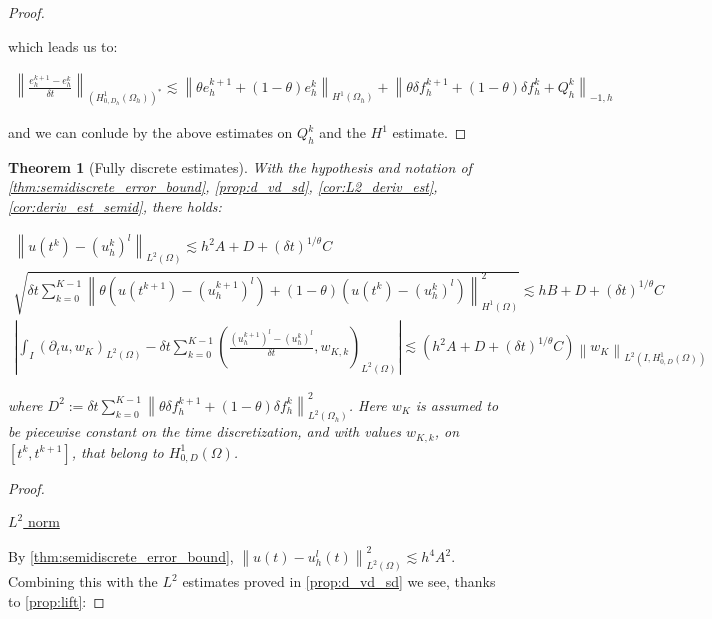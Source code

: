 \documentclass[english,a4paper,9pt,oneside]{scrbook}	%
\theoremstyle{break}
\newtheorem{thm}[equation]{Theorem}
\newenvironment{mproof}[1][\proofname]{%
  \begin{proof}[#1]$ $\par\nobreak\ignorespaces
}{%
  \end{proof}
}
\renewcommand*{\proofname}{Proof}
\theoremstyle{remark}
\newcommand{\ds}{\displaystyle}
\newcommand{\norm}[1]{\left\lVert#1\right\rVert}
\begin{document}
\begin{appendices}
\begin{mproof}
which leads us to:

\begin{align*}
\norm{ \frac{e_{h}^{k+1}-e_h^k}{\delta t}}_{(H^1_{0,D_h}(\Omega_h))^*} \lesssim  \norm{\theta e_h^{k+1}+(1-\theta)e^k_h}_{H^1(\Omega_h)} + \norm{\theta \delta f_h^{k+1}+(1-\theta)\delta f_h^k + Q_h^k}_{-1,h}
\end{align*}

and we can conlude by the above estimates on $Q_h^k$ and the $H^1$ estimate.
\end{mproof}

\begin{thm}[Fully discrete estimates]
\label{thm:fully_discr_est_par}
With the hypothesis and notation of \cref{thm:semidiscrete_error_bound}, \cref{prop:d_vd_sd}, \cref{cor:L2_deriv_est}, \cref{cor:deriv_est_semid}, there holds:

\begin{align*}
	\norm{u(t^k)-(u_h^k)^l}_{L^2(\Omega)}\lesssim  h^2 A  + D +  (\delta t)^{1/\theta}C\\
	\sqrt{\delta t \sum_{k=0}^{K-1} \norm{\theta(u(t^{k+1}) - (u_h^{k+1})^l) + (1-\theta)(u(t^{k}) - (u_h^{k})^l)}_{H^1(\Omega)}^2} \lesssim hB + D + (\delta t)^{1/\theta} C\\
	\left | \int_I (\partial_t u , w_K)_{L^2(\Omega)}-\delta t \sum_{k=0}^{K-1}\left ( \frac{(u^{k+1}_h)^l - (u_h^k)^l}{\delta t} , w_{K,k}\right )_{L^2(\Omega)} \right |\lesssim \left ( h^2A + D + (\delta t)^{1/\theta} C\right ) \norm{w_K}_{L^2(I,H^1_{0,D}(\Omega))}
\end{align*}

where $D^2:= \ds {\delta t\sum_{k=0}^{K-1} \norm{\theta \delta f_h^{k+1}+(1-\theta)\delta f_h^k}_{L^2(\Omega_h)}^2}$. Here $w_K$ is assumed to be piecewise constant on the time discretization, and with values $w_{K,k}$, on $[t^k,t^{k+1}]$, that belong to $H^1_{0,D}(\Omega)$.
\end{thm}

\begin{mproof}

\underline{$L^2$ norm}

By \cref{thm:semidiscrete_error_bound}, $\norm{u(t)-u_h^l(t)}_{L^2(\Omega)}^2 \lesssim	 h^4A^2$. Combining this with the $L^2$ estimates proved in \cref{prop:d_vd_sd} we see, thanks to \cref{prop:lift}:


\end{mproof}
\end{appendices}
\end{document}
